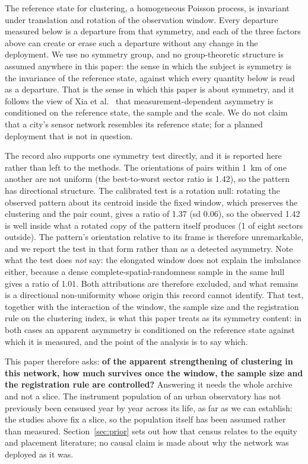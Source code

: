 \documentclass{article}
\newcommand{\isoRatio}{1.42}
\newcommand{\isoRotMean}{1.37}
\newcommand{\isoRotSd}{0.06}
\newcommand{\isoRotOutside}{1}
\newcommand{\isoWindowRatio}{1.01}
\begin{document}
The reference state for clustering, a homogeneous Poisson process, is invariant under
translation and rotation of the observation window. Every departure measured below is a
departure from that symmetry, and each of the three factors above can create or erase such a
departure without any change in the deployment. We use no symmetry group, and no
group-theoretic structure is assumed anywhere in this paper: the sense in which the subject is
symmetry is the invariance of the reference state, against which every quantity below is read
as a departure. That is the sense in which this paper is about
symmetry, and it follows the view of Xia et al.~\cite{xia2026measurement} that
measurement-dependent asymmetry is conditioned on the reference state, the sample and the
scale. We do not claim that a city's sensor network resembles its reference state; for a planned
deployment that is not in question.

The record also supports one symmetry test directly, and it is reported here rather than left to
the methods. The orientations of pairs within \SI{1}{\kilo\meter} of one another are not uniform
(the best-to-worst sector ratio is \isoRatio), so the pattern has directional structure. The
calibrated test is a rotation null: rotating the observed pattern about its centroid inside the
fixed window, which preserves the clustering and the pair count, gives a ratio of
\isoRotMean{} (sd \isoRotSd), so the observed \isoRatio{} is well inside what a rotated copy of
the pattern itself produces (\isoRotOutside{} of eight sectors outside). The pattern's
orientation relative to its frame is therefore unremarkable, and we report the test in that form
rather than as a detected asymmetry. Note what the test does \emph{not} say: the elongated
window does not explain the imbalance either, because a dense complete-spatial-randomness sample
in the same hull gives a ratio of \num{\isoWindowRatio}. Both attributions are therefore
excluded, and what remains is a directional non-uniformity whose origin this record cannot
identify. That test, together with the interaction of the window, the sample size and the
registration rule on the clustering
index, is what this paper treats as its symmetry content: in both cases an apparent asymmetry is
conditioned on the reference state against which it is measured, and the point of the analysis is
to say which.

This paper therefore asks: \textbf{of the apparent strengthening of clustering in this network,
how much survives once the window, the sample size and the registration rule are controlled?}
Answering it needs the whole archive and not a slice. The instrument population of an urban
observatory has not previously been censused year by year across its life, as far as we can
establish: the studies above fix a slice, so the population itself has been assumed rather than
measured. Section~\ref{sec:prior} sets out how that census relates to the equity and placement
literature; no causal claim is made about why the network was deployed as it was.
\end{document}

